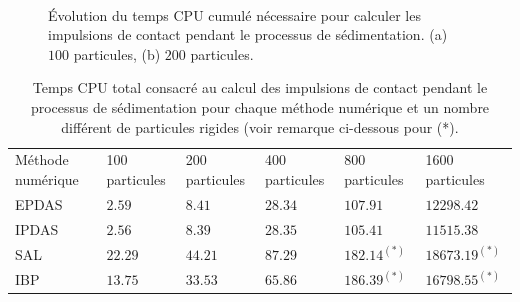 \begin{figure}[h!]
\hspace{\fill}
   \\
\caption{\label{cumul_cpu}Évolution du temps CPU cumulé nécessaire pour calculer les impulsions de contact pendant le processus de sédimentation. (a) $100 $ particules, (b) $200 $ particules.}
\end{figure}

\begin{table}[!h]
\begin{tabular}{|p{2cm}|p{1.75cm}|p{1.75cm}|p{1.75cm}|p{1.9cm}|p{1.9cm}|}
  \hline \rowcolor{lightgray}
  \multicolumn{6}{|c|}{Temps CPU total (s)} \\
  \hline \rowcolor{lightgray}
  Méthode numérique & 100 particules & 200 particules& 400 particules & 800 particules & 1600 particules \\ 
  \hline  EPDAS & $2.59$ & $8.41$ & $28.34$ & $107.91$ & $12298.42$\\
  IPDAS & $2.56$ & $8.39$ & $28.35$ & $105.41$ & $11515.38$\\
  SAL & $22.29$ & $44.21$ & $87.29$ & $182.14^{(*)}$ & $18673.19^{(*)}$\\
  IBP & $13.75$ & $33.53$ & $65.86$ & $186.39^{(*)}$ & $16798.55^{(*)}$\\ 
 \hline
\end{tabular}
 \caption{Temps CPU total consacré au calcul des impulsions de contact pendant le processus de sédimentation pour chaque méthode numérique et un nombre différent de particules rigides (voir remarque ci-dessous pour (*).}\label{tab18}
\end{table}

